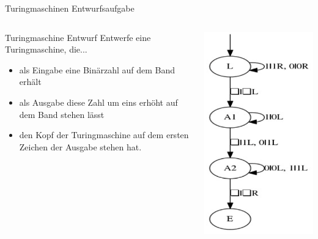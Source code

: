 \begin{frame}{Turingmaschinen Entwurfsaufgabe}
	
	\begin{columns}
		\begin{column}{0.65\textwidth}
			\begin{taskblock}{Turingmaschine Entwurf}
				Entwerfe eine Turingmaschine, die...
				\begin{itemize}
					\item als Eingabe eine Binärzahl auf dem Band erhält
					\item als Ausgabe diese Zahl um eins erhöht auf dem Band stehen lässt
					\item den Kopf der Turingmaschine auf dem ersten Zeichen der Ausgabe stehen hat.
				\end{itemize}
			\end{taskblock}
		\end{column}
		
		\begin{column}{0.45\textwidth}
			\pause
			
			\includegraphics[scale=0.5]{images/turingmaschine_plusone.png}
		\end{column}
	\end{columns}
	
\end{frame}

